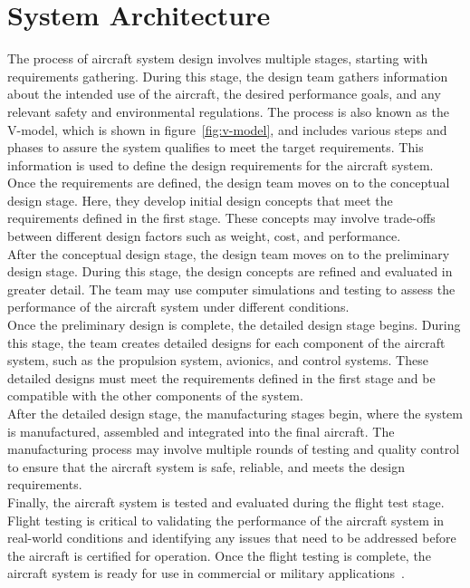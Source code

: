 \section{System Architecture}\label{sec:system-architecture}
The process of aircraft system design involves multiple stages, starting with requirements gathering.
During this stage, the design team gathers information about the intended use of the aircraft, the desired performance goals, and any relevant safety and environmental regulations.
The process is also known as the V-model, which is shown in figure~\ref{fig:v-model}, and includes various steps and phases to
assure the system qualifies to meet the target requirements.
This information is used to define the design requirements for the aircraft system.
\\
Once the requirements are defined, the design team moves on to the conceptual design stage.
Here, they develop initial design concepts that meet the requirements defined in the first stage.
These concepts may involve trade-offs between different design factors such as weight, cost, and performance.
\\
After the conceptual design stage, the design team moves on to the preliminary design stage.
During this stage, the design concepts are refined and evaluated in greater detail.
The team may use computer simulations and testing to assess the performance of the aircraft system under different conditions.
\\
Once the preliminary design is complete, the detailed design stage begins.
During this stage, the team creates detailed designs for each component of the aircraft system, such as the propulsion system, avionics, and control systems.
These detailed designs must meet the requirements defined in the first stage and be compatible with the other components of the system.
\\
After the detailed design stage, the manufacturing stages begin, where the system is manufactured, assembled and integrated into the final aircraft.
The manufacturing process may involve multiple rounds of testing and quality control to ensure that the aircraft system is safe, reliable, and meets the design requirements.
\\
Finally, the aircraft system is tested and evaluated during the flight test stage.
Flight testing is critical to validating the performance of the aircraft system in real-world conditions and identifying any issues that need to be addressed before the aircraft is certified for operation.
Once the flight testing is complete, the aircraft system is ready for use in commercial or military applications~\cite{lfs1,doi:10.1177/09544100211024787}.
